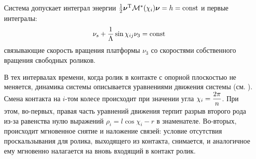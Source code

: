 
Система допускает интеграл энергии $\frac{1}{2}\boldsymbol{\mathbf{\nu}}^\mathrm{T}\mathcal{M}^*(\chi_i)\boldsymbol{\mathbf{\nu}} = h = \mathrm{const}$ и первые интегралы:
\begin{equation}
    \label{int_free_roller}
\nu_s + \displaystyle\frac{\displaystyle 1}{\displaystyle \Lambda}\sin\chi_{ij}\nu_3 = \mathrm{const}
\end{equation}
связывающие скорость вращения платформы $\nu_3$ со скоростями собственного вращения свободных роликов.

В тех интервалах времени, когда ролик в контакте с опорной плоскостью не меняется, динамика системы описывается уравнениями движения системы (см. \cite{ZobovaGerasimovPMM}). Смена контакта на $i$-том колесе происходит при значении угла $\chi_i = \displaystyle\frac{\displaystyle 2\pi}{\displaystyle n}$. При этом, во-первых, правая часть уравнений движения терпит разрыв второго рода из-за равенства нулю выражений $\rho_i = l\cos\chi_i-r$ в знаменателе. Во-вторых, происходит мгновенное снятие и наложение связей: условие отсутствия проскальзывания для ролика, выходящего из контакта, снимается, и аналогичное ему мгновенно налагается на вновь входящий в контакт ролик.

